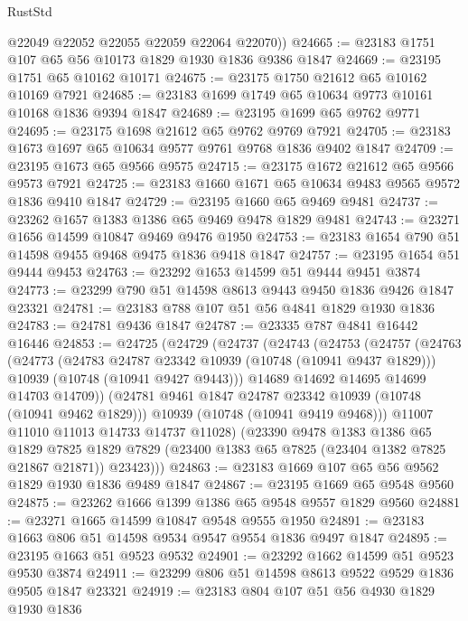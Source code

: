 \begin{lexlean}{RustStd}
\begin{coremodule}
        @22049
        @22052
        @22055
        @22059
        @22064
        @22070))
@24665 := @23183 @1751 @107 @65 @56 @10173 @1829 @1930 @1836 @9386 @1847
@24669 := @23195 @1751 @65 @10162 @10171
@24675 := @23175 @1750 @21612 @65 @10162 @10169 @7921
@24685 := @23183 @1699 @1749 @65 @10634 @9773 @10161 @10168 @1836 @9394 @1847
@24689 := @23195 @1699 @65 @9762 @9771
@24695 := @23175 @1698 @21612 @65 @9762 @9769 @7921
@24705 := @23183 @1673 @1697 @65 @10634 @9577 @9761 @9768 @1836 @9402 @1847
@24709 := @23195 @1673 @65 @9566 @9575
@24715 := @23175 @1672 @21612 @65 @9566 @9573 @7921
@24725 := @23183 @1660 @1671 @65 @10634 @9483 @9565 @9572 @1836 @9410 @1847
@24729 := @23195 @1660 @65 @9469 @9481
@24737 := @23262 @1657 @1383 @1386 @65 @9469 @9478 @1829 @9481
@24743 := @23271 @1656 @14599 @10847 @9469 @9476 @1950
@24753 := @23183 @1654 @790 @51 @14598 @9455 @9468 @9475 @1836 @9418 @1847
@24757 := @23195 @1654 @51 @9444 @9453
@24763 := @23292 @1653 @14599 @51 @9444 @9451 @3874
@24773 := @23299 @790 @51 @14598 @8613 @9443 @9450 @1836 @9426 @1847 @23321
@24781 := @23183 @788 @107 @51 @56 @4841 @1829 @1930 @1836
@24783 := @24781 @9436 @1847
@24787 := @23335 @787 @4841 @16442 @16446
@24853 := @24725
    (@24729
      (@24737
        (@24743
          (@24753
            (@24757
              (@24763
                (@24773
                  (@24783 @24787 @23342 @10939 (@10748 (@10941 @9437 @1829)))
                  @10939
                  (@10748 (@10941 @9427 @9443)))
                @14689
                @14692
                @14695
                @14699
                @14703
                @14709))
            (@24781 @9461 @1847 @24787 @23342 @10939 (@10748 (@10941 @9462 @1829)))
            @10939
            (@10748 (@10941 @9419 @9468)))
          @11007
          @11010
          @11013
          @14733
          @14737
          @11028)
        (@23390
          @9478
          @1383
          @1386
          @65
          @1829
          @7825
          @1829
          @7829
          (@23400 @1383 @65 @7825 (@23404 @1382 @7825 @21867 @21871))
          @23423)))
@24863 := @23183 @1669 @107 @65 @56 @9562 @1829 @1930 @1836 @9489 @1847
@24867 := @23195 @1669 @65 @9548 @9560
@24875 := @23262 @1666 @1399 @1386 @65 @9548 @9557 @1829 @9560
@24881 := @23271 @1665 @14599 @10847 @9548 @9555 @1950
@24891 := @23183 @1663 @806 @51 @14598 @9534 @9547 @9554 @1836 @9497 @1847
@24895 := @23195 @1663 @51 @9523 @9532
@24901 := @23292 @1662 @14599 @51 @9523 @9530 @3874
@24911 := @23299 @806 @51 @14598 @8613 @9522 @9529 @1836 @9505 @1847 @23321
@24919 := @23183 @804 @107 @51 @56 @4930 @1829 @1930 @1836

\end{coremodule}
\end{lexlean}
